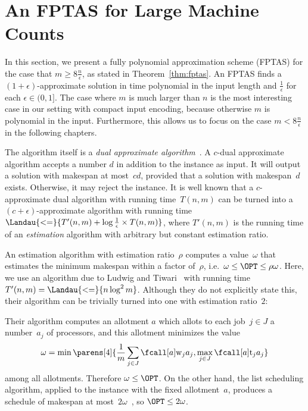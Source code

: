 \section{An FPTAS for Large Machine Counts}
\label{sec:fptas}

In this section, we present a fully polynomial approximation scheme (FPTAS)
for the case that $m \geq 8\frac{n}{\epsilon}$,
as stated in Theorem~\ref{thm:fptas}.
An FPTAS finds a $(1 + \epsilon)$-approximate solution
in time polynomial in the input length and $\frac{1}{\epsilon}$
for each $\epsilon \in (0, 1]$.
The case where $m$ is much larger than $n$ is the most interesting case
in our setting with compact input encoding,
because otherwise $m$ is polynomial in the input.
Furthermore, this allows us to focus on the case $m < 8\frac{n}{\epsilon}$
in the following chapters.

The algorithm itself is a \emph{dual approximate algorithm}~\cite{hochbaum87}.
A $c$-dual approximate algorithm accepts a number $d$ in addition to the instance as input.
It will output a solution with makespan at most~$cd$,
provided that a solution with makespan~$d$ exists.
Otherwise, it may reject the instance.
It is well known that a $c$-approximate dual algorithm with running time~$T(n, m)$
can be turned into a $(c + \epsilon)$-approximate algorithm
with running time~$\Landau{<=}{T'(n, m) + \log \frac{1}{\epsilon} \times T(n, m)}$,
where $T'(n, m)$ is the running time of an \emph{estimation} algorithm with arbitrary but constant estimation ratio.

An estimation algorithm with estimation ratio~$\rho$ computes a value~$\omega$
that estimates the minimum makespan within a factor of~$\rho$,
i.e.~$\omega \leq \OPT \leq \rho \omega$.
Here, we use an algorithm due to Ludwig and Tiwari~\cite{ludwig94}
with running time~$T'(n, m) = \Landau{<=}{n \log^2 m}$.
Although they do not explicitly state this,
their algorithm can be trivially turned into one with estimation ratio~$2$:

Their algorithm computes an allotment $a$
which allots to each job~$j \in J$ a number~$a_j$ of processors,
and this allotment minimizes the value
\begin{equation}
  \omega = \min \parens[4]{\frac{1}{m} \sum_{j \in J} \work{j}{a_j},
    \max_{j \in J} \ptm{j}{a_j}}
\end{equation}
among all allotments.
Therefore $\omega \leq \OPT$.
On the other hand, the list scheduling algorithm,
applied to the instance with the fixed allotment~$a$,
produces a schedule of makespan at most~$2 \omega$~\cite{garey75},
so $\OPT \leq 2 \omega$.


